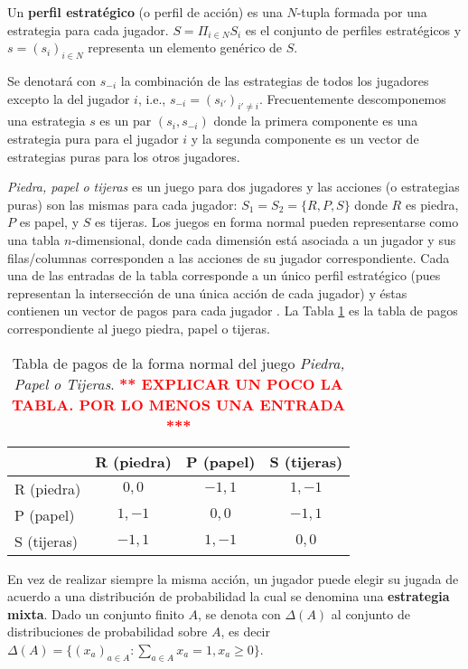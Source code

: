 \begin{definition} Un \textbf{perfil estratégico} (o perfil de acción) es una $N$-tupla formada por una estrategia para cada jugador. $S = \Pi_{i \in N}S_i$ es el conjunto de perfiles estratégicos y $s = (s_i)_{i \in N}$ representa un elemento genérico de $S$.  
\end{definition}

Se denotará con $s_{-i}$ la combinación de las estrategias de todos los jugadores excepto la del jugador $i$, i.e., $s_{-i} = (s_{i'})_{i' \neq i}$. Frecuentemente descomponemos una estrategia $s$ es un par $(s_i,s_{-i})$ donde la primera componente es una estrategia pura para el jugador $i$ y la segunda componente es un vector de estrategias puras para los otros jugadores.

\textit{Piedra, papel o tijeras} es un juego para dos jugadores y las acciones (o estrategias puras) son las mismas para cada jugador: $S_1 = S_2 = \{R, P, S \}$ donde $R$ es piedra, $P$ es papel, y $S$ es tijeras. Los juegos en forma normal pueden representarse como una tabla $n$-dimensional, donde cada dimensión está asociada a un jugador y sus filas/columnas corresponden a las acciones de su jugador correspondiente. Cada una de las entradas de la tabla corresponde a un único perfil estratégico (pues representan la intersección de una única acción de cada jugador) y éstas contienen un vector de pagos para cada jugador \cite{bib:introductionCFR}. La Tabla \ref{table:pago-RPS} es la tabla de pagos correspondiente al juego piedra, papel o tijeras.

\begin{table}[t]
\begin{center}
\caption{Tabla de pagos de la forma normal del juego \textit{Piedra, Papel o Tijeras}. \textcolor{red}{\bf*** EXPLICAR UN POCO LA TABLA. POR LO MENOS UNA ENTRADA ***}}
\label{table:pago-RPS}
\begin{tabular}{l  c  c  c}
  & R (piedra) & P (papel) & S (tijeras) \\ \midrule
R (piedra) & $0,0$ & $-1,1$ & $1,-1$ \\ 
P (papel) & $1,-1$ & $0,0$ & $-1,1$ \\ 
S (tijeras) & $-1,1$ & $1,-1$ & $0,0$ \\ 
\end{tabular}
\end{center}
\end{table}

En vez de realizar siempre la misma acción, un jugador puede elegir su jugada de acuerdo a una distribución de probabilidad la cual se denomina una \textbf{estrategia mixta}. Dado un conjunto finito $A$, se denota con $\Delta(A)$ al conjunto de distribuciones de probabilidad sobre $A$, es decir $\Delta(A) = \{ (x_a)_{a \in A} : \sum_{a \in A} x_a = 1, x_a \geq 0\}$. 

